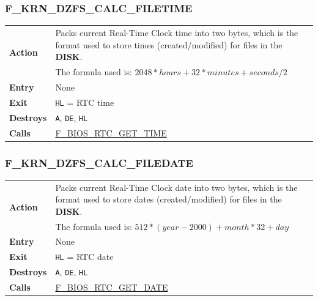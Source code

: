 \documentclass[a4paper,11pt]{article}
\begin{document}
        \subsubsection{F\_KRN\_DZFS\_CALC\_FILETIME}
        \label{func:fkrndzfscalcfiletime}
        \begin{tabular}{l p{9cm}}
            \hline\multirow[t]{2}{4em}{\textbf{Action}}
            & Packs current Real-Time Clock time into two bytes, which is the
            format used to store times (created/modified) for files in the 
            \textbf{DISK}.\\
            & The formula used is: $2048 * hours + 32 * minutes + seconds / 2$\\
            \hline\textbf{Entry} & None\\
            \hline\textbf{Exit} & \texttt{HL} = RTC time\\
            \hline\textbf{Destroys} & \texttt{A}, \texttt{DE}, \texttt{HL}\\
            \hline\textbf{Calls}
            & \hyperref[func:fbiosrtcgettime]{F\_BIOS\_RTC\_GET\_TIME}\\
            \hline
        \end{tabular}

        \subsubsection{F\_KRN\_DZFS\_CALC\_FILEDATE}
        \label{func:fkrndzfscalcfiledate}
        \begin{tabular}{l p{9cm}}
            \hline\multirow[t]{2}{4em}{\textbf{Action}}
            & Packs current Real-Time Clock date into two bytes, which is the
            format used to store dates (created/modified) for files in the 
            \textbf{DISK}.\\
            & The formula used is: $512 * (year - 2000) + month * 32 + day$\\
            \hline\textbf{Entry} & None\\
            \hline\textbf{Exit} & \texttt{HL} = RTC date\\
            \hline\textbf{Destroys} & \texttt{A}, \texttt{DE}, \texttt{HL}\\
            \hline\textbf{Calls}
            & \hyperref[func:fbiosrtcgetdate]{F\_BIOS\_RTC\_GET\_DATE}\\
            \hline
        \end{tabular}
\end{document}
